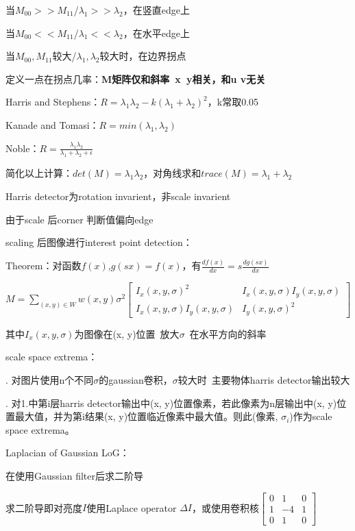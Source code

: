 \documentclass[UTF8]{ctexart}
\begin{document}
  \quad \quad \quad 当$M_{00} >> M_{11}$/$\lambda_1 >> \lambda_2$，在竖直edge上

  \quad \quad \quad 当$M_{00} << M_{11}$/$\lambda_1 << \lambda_2$，在水平edge上

  \quad \quad \quad 当$M_{00}, M_{11}$较大/$\lambda_1, \lambda_2$较大时，在边界拐点

  \quad 定义一点在拐点几率：\textbf{M矩阵仅和斜率\ x\ y相关，和u v无关}

  \quad \quad Harris and Stephens：$R = \lambda_1\lambda_2 - k(\lambda_1 + \lambda_2)^2$，k常取0.05

  \quad \quad Kanade and Tomasi：$R = min(\lambda_1, \lambda_2)$

  \quad \quad Noble：$R = \frac{\lambda_1\lambda_2}{\lambda_1 + \lambda_2 + \epsilon}$

  \quad \quad 简化以上计算：$det(M) = \lambda_1\lambda_2$，对角线求和$trace(M) = \lambda_1 + \lambda_2$

  \quad Harris detector为rotation invarient，非scale invarient

  \quad \quad 由于scale 后corner 判断值偏向edge

  \quad \quad 

  scaling 后图像进行interest point detection：

  \quad Theorem：对函数$f(x)$,$g(sx) = f(x)$，有$\frac{df(x)}{dx} = s\frac{dg(sx)}{dx}$

  \quad $M = \sum_{(x, y) \in W}w(x, y)\sigma^2
    \begin{bmatrix}
      I_x(x, y, \sigma)^2 & I_x(x, y, \sigma)I_y(x, y, \sigma) \\
      I_x(x, y, \sigma)I_y(x, y, \sigma) & I_y(x, y, \sigma)^2
      \end{bmatrix}$

  \quad \quad 其中$I_x(x, y, \sigma)$为图像在(x, y)位置\ 放大$\sigma$\ 在水平方向的斜率

  \quad scale space extrema：

  \quad {}. 对图片使用n个不同$\sigma$的gaussian卷积，$\sigma$较大时\ 主要物体harris detector输出较大

  \quad {}. 对1.中第i层harris detector输出中(x, y)位置像素，若此像素为n层输出中(x, y)位置最大值，并为第i结果(x, y)位置临近像素中最大值。则此(像素, $\sigma_i$)作为scale space extrema。

  Laplacian of Gaussian LoG：

  \quad 在使用Gaussian filter后求二阶导

  \quad \quad 求二阶导即对亮度$I$使用Laplace operator $\Delta I$，或使用卷积核$
    \begin{bmatrix}
      0 & 1 & 0 \\
      1 & -4 & 1 \\
      0 & 1 & 0
      \end{bmatrix}$
\end{document}
